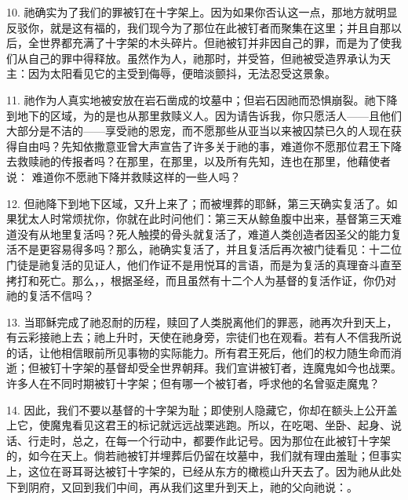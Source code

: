 \par

10. 祂确实为了我们的罪被钉在十字架上。因为如果你否认这一点，那地方就明显反驳你，就是这有福的，我们现今为了那位在此被钉者而聚集在这里；并且自那以后，全世界都充满了十字架的木头碎片。但祂被钉并非因自己的罪，而是为了使我们从自己的罪中得释放。虽然作为人，祂那时，并受笞，但祂被受造界承认为天主：因为太阳看见它的主受到侮辱，便暗淡颤抖，无法忍受这景象。\par

\par

11. 祂作为人真实地被安放在岩石凿成的坟墓中；但岩石因祂而恐惧崩裂。祂下降到地下的区域，为的是也从那里救赎义人。因为请告诉我，你只愿活人——且他们大部分是不洁的——享受祂的恩宠，而不愿那些从亚当以来被囚禁已久的人现在获得自由吗？先知依撒意亚曾大声宣告了许多关于祂的事，难道你不愿那位君王下降去救赎祂的传报者吗？在那里，在那里，以及所有先知，连也在那里，他藉使者说： 难道你不愿祂下降并救赎这样的一些人吗？\par

\par

12. 但祂降下到地下区域，又升上来了；而被埋葬的耶稣，第三天确实复活了。如果犹太人时常烦扰你，你就在此时问他们：第三天从鲸鱼腹中出来，基督第三天难道没有从地里复活吗？死人触摸的骨头就复活了，难道人类创造者因圣父的能力复活不是更容易得多吗？那么，祂确实复活了，并且复活后再次被门徒看见：十二位门徒是祂复活的见证人，他们作证不是用悦耳的言语，而是为复活的真理奋斗直至拷打和死亡。那么，，根据圣经，而且虽然有十二个人为基督的复活作证，你仍对祂的复活不信吗？\par

\par

13. 当耶稣完成了祂忍耐的历程，赎回了人类脱离他们的罪恶，祂再次升到天上，有云彩接祂上去；祂上升时，天使在祂身旁，宗徒们也在观看。若有人不信我所说的话，让他相信眼前所见事物的实际能力。所有君王死后，他们的权力随生命而消逝；但被钉十字架的基督却受全世界朝拜。我们宣讲被钉者，连魔鬼如今也战栗。许多人在不同时期被钉十字架；但有哪一个被钉者，呼求他的名曾驱走魔鬼？\par

14. 因此，我们不要以基督的十字架为耻；即使别人隐藏它，你却在额头上公开盖上它，使魔鬼看见这君王的标记就远远战栗逃跑。所以，在吃喝、坐卧、起身、说话、行走时，总之，在每一个行动中，都要作此记号。因为那位在此被钉十字架的，如今在天上。倘若祂被钉并埋葬后仍留在坟墓中，我们就有理由羞耻；但事实上，这位在哥耳哥达被钉十字架的，已经从东方的橄榄山升天去了。因为祂从此处下到阴府，又回到我们中间，再从我们这里升到天上，祂的父向祂说：。\par

